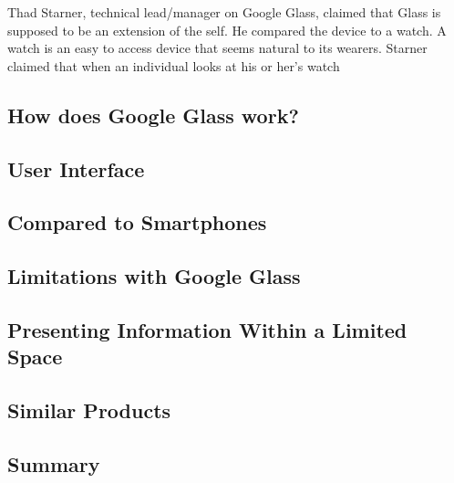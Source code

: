 Thad Starner, technical lead/manager on Google Glass, claimed that Glass is supposed to be an extension of the self. He compared the device to a watch. A watch is an easy to access device that seems natural to its wearers. Starner claimed that when an individual looks at his or her's watch 




\subsection{How does Google Glass work?}
\label{subsec:googleglass}


\subsection{User Interface}
\label{subsec:userinterface}


\subsection{Compared to Smartphones}
\label{comparedtophones}


\subsection{Limitations with Google Glass}
\label{subsec:limitations}


\subsection{Presenting Information Within a Limited Space}
\label{subsec:informationlimitedspace}


\subsection{Similar Products}
\label{subsec:similarproducts}


\subsection{Summary}
\label{subsec:summary}










